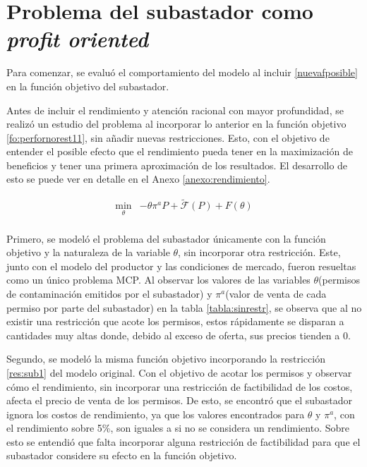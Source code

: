 \section{Problema del subastador como \textit{profit oriented}}\label{profit}



Para comenzar, se evaluó el comportamiento del modelo al incluir \ref{nuevafposible} en la función objetivo del subastador.
\vspace{2.5mm}

Antes de incluir el rendimiento y atención racional con mayor profundidad, se realizó un estudio del problema al incorporar lo anterior en la función objetivo \ref{fo:perfornorest11}, sin añadir nuevas restricciones. Esto, con el objetivo de entender el posible efecto que el rendimiento pueda tener en la maximización de beneficios y tener una primera aproximación de los resultados. El desarrollo de esto se puede ver en detalle en el Anexo \ref{anexo:rendimiento}. \vspace{2.5mm}

\begin{equation}
\begin{array}{rrclcl}
    \displaystyle \min_{\theta} & -\theta \pi^aP + \tilde{\mathcal{F}}(P)+F(\theta)  \label{fo:perfornorest11}\\
\end{array}
\end{equation}

Primero, se modeló el problema del subastador únicamente con la función objetivo y la naturaleza de la variable $\theta$, sin incorporar otra restricción. Este, junto con el modelo del productor y las condiciones de mercado, fueron resueltas como un único problema MCP. Al observar los valores de las variables $\theta$(permisos de contaminación emitidos por el subastador) y $\pi^a$(valor de venta de cada permiso por parte del subastador) en la tabla \ref{tabla:sinrestr}, se observa que al no existir una restricción que acote los permisos, estos rápidamente se disparan a cantidades muy altas donde, debido al exceso de oferta, sus precios tienden a 0.
\vspace{2.5mm}

Segundo, se modeló la misma función objetivo incorporando la restricción \ref{res:sub1} del modelo original. Con el objetivo de acotar los permisos y observar cómo el rendimiento, sin incorporar una restricción de factibilidad de los costos, afecta el precio de venta de los permisos. De esto, se encontró que el subastador ignora los costos de rendimiento, ya que los valores encontrados para $\theta$ y  $\pi^a$, con el rendimiento sobre 5\%, son iguales a si no se considera un rendimiento. Sobre esto se entendió que falta incorporar alguna restricción de factibilidad para que el subastador considere su efecto en la función objetivo.
\vspace{2.5mm}

